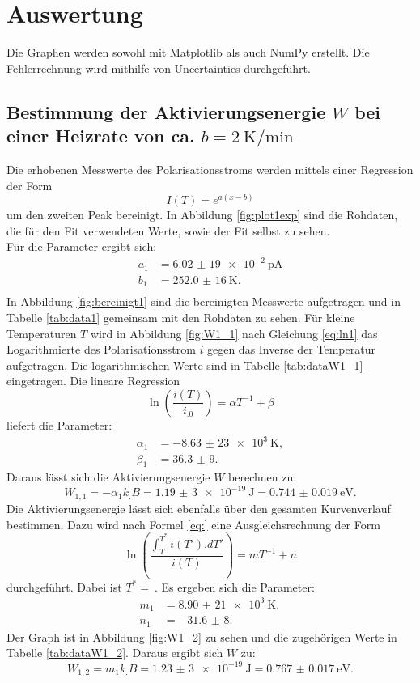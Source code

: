\section{Auswertung}
\label{sec:Auswertung}

Die Graphen werden sowohl mit Matplotlib \cite{matplotlib} als auch NumPy \cite{numpy} erstellt. Die Fehlerrechnung wird mithilfe von Uncertainties \cite{uncertainties} durchgeführt.

\subsection{Bestimmung der Aktivierungsenergie $W$ bei einer Heizrate von ca. $b=\SI{2}{\kelvin\per\minute}$}

Die erhobenen Messwerte des Polarisationsstroms werden mittels einer Regression der Form
\begin{equation}
I(T)=e^{a(x-b)} \label{eq:reg1}
\end{equation}
um den zweiten Peak bereinigt. In Abbildung \ref{fig:plot1exp} sind die Rohdaten, die für den Fit verwendeten Werte, sowie der Fit selbst zu sehen.\\
Für die Parameter ergibt sich:
\begin{align*}
a_1&=\SI{6,02(19)e-2}{\pico\ampere}\\
b_1&=\SI{252,0(16)}{\kelvin}\text{.}\\
\end{align*}
In Abbildung \ref{fig:bereinigt1} sind die bereinigten Messwerte aufgetragen und in Tabelle \ref{tab:data1} gemeinsam mit den Rohdaten zu sehen.
Für kleine Temperaturen $T$ wird in Abbildung \ref{fig:W1_1} nach Gleichung \eqref{eq:ln1} das Logarithmierte des Polarisationsstrom $i$ gegen das Inverse der Temperatur aufgetragen. Die logarithmischen Werte sind in Tabelle \ref{tab:dataW1_1} eingetragen.
Die lineare Regression
\begin{equation}
\ln\left(\frac{i(T)}{i_.0}\right)=\alpha T^{-1}+\beta \label{eq:reg2}
\end{equation}
liefert die Parameter:
\begin{align*}
\alpha_1&=\SI{-8,63(23)e3}{\kelvin},\\
\beta_1 &= \num{36,3(9)}\text{.}
\end{align*}
Daraus lässt sich die Aktivierungsenergie $W$ berechnen zu:
\[
W_{1,1} = -\alpha_1 k_.B =\SI{1,19(3)e-19}{\joule}=\SI{0.744(19)}{\electronvolt}\text{.}
\]
Die Aktivierungsenergie lässt sich ebenfalls über den gesamten Kurvenverlauf bestimmen. Dazu wird nach Formel \eqref{eq:} eine Ausgleichsrechnung der Form 
\begin{equation}
\ln\left(\frac{\int_T^{T^*} i(T').dT'}{i(T)}\right) = mT^{-1}+n \label{eq:reg3}
\end{equation}
durchgeführt. Dabei ist $T^*=\SI{}{}$. Es ergeben sich die Parameter:
\begin{align*}
m_1&=\SI{8,90(21)e3}{\kelvin},\\
n_1&=\num{-31,6(8)}\text{.}
\end{align*}
Der Graph ist in Abbildung \ref{fig:W1_2} zu sehen und die zugehörigen Werte in Tabelle \ref{tab:dataW1_2}.
Daraus ergibt sich $W$ zu:
\[
W_{1,2} = m_1 k_.B =\SI{1,23(3)e-19}{\joule}=\SI{0.767(17)}{\electronvolt}\text{.}
\]

